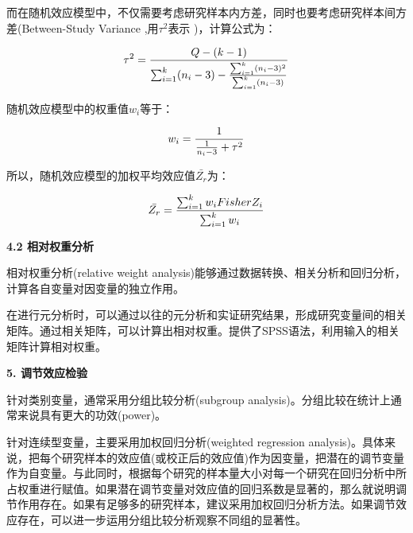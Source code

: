 \documentclass[
]{book}
\begin{document}
而在随机效应模型中，不仅需要考虑研究样本内方差，同时也要考虑研究样本间方差(Between-Study Variance ,用\(\tau^{2}\)表示 )，计算公式为：

\[
\tau^{2}={{Q-(k-1)}\over{\sum_{i=1}^{k}(n_{i}-3)-{{\sum_{i=1}^{k}(n_{i}-3)^{2}}\over{\sum_{i=1}^{k}(n_{i}-3)}}}}
\]

随机效应模型中的权重值\(w_{i}\)等于：

\[
w_{i}={{1}\over{{{1}\over{n_{i}-3}}+\tau^{2}}}
\]

所以，随机效应模型的加权平均效应值\(\bar{Z_{r}}\)为：

\[
\bar{Z_{r}}={{\sum_{i=1}^{k}w_{i}FisherZ_{i}}\over{\sum_{i=1}^{k}w_{i}}}
\]

\textbf{4.2 相对权重分析}

相对权重分析(relative weight analysis)能够通过数据转换、相关分析和回归分析，计算各自变量对因变量的独立作用\autocite{xuyan2019:RNG}。

在进行元分析时，可以通过以往的元分析和实证研究结果，形成研究变量间的相关矩阵。通过相关矩阵，可以计算出相对权重。\autocite{Lebreton2008:RNG}提供了SPSS语法，利用输入的相关矩阵计算相对权重。

\textbf{5. 调节效应检验}

针对类别变量，通常采用分组比较分析(subgroup analysis)。分组比较在统计上通常来说具有更大的功效(power)。

针对连续型变量，主要采用加权回归分析(weighted regression analysis)。具体来说，把每个研究样本的效应值(或校正后的效应值)作为因变量，把潜在的调节变量作为自变量。与此同时，根据每个研究的样本量大小对每一个研究在回归分析中所占权重进行赋值。如果潜在调节变量对效应值的回归系数是显著的，那么就说明调节作用存在。如果有足够多的研究样本，建议采用加权回归分析方法。如果调节效应存在，可以进一步运用分组比较分析观察不同组的显著性。

\printbibliography
\end{document}
